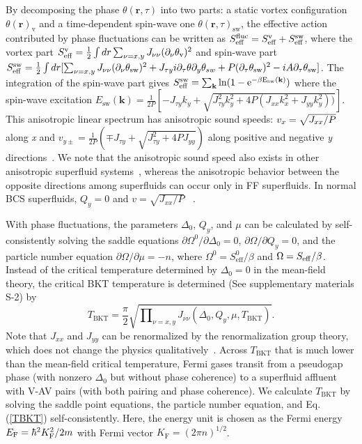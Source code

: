 \documentclass[prl,aps,twocolumn,showpacs, floatfix]{revtex4}
\begin{document}
By decomposing the phase $\theta (\mathbf{r},\tau )$ into two parts: a
static vortex configuration $\theta (\mathbf{r})_{\mathrm{v}}$ and a
time-dependent spin-wave one $\theta (\mathbf{r},\tau )_{\mathrm{sw}}$, the
effective action contributed by phase fluctuations can be written as $S_{%
\mathrm{eff}}^{\mathrm{fluc}}=S_{\mathrm{eff}}^{\mathrm{v}}+S_{\mathrm{eff}%
}^{\mathrm{sw}}$, where the vortex part $S_{\mathrm{eff}}^{\mathrm{v}}=\frac{%
1}{2}\int d{r}\sum_{\nu =x,y}J_{\nu \nu }(\partial _{\nu }\theta _{\mathrm{v}%
})^{2}$ and spin-wave part $S_{\mathrm{eff}}^{\mathrm{sw}}=\frac{1}{2}\int d{%
r}[\sum_{\nu =x,y}J_{\nu \nu }(\partial _{\nu }\theta _{\mathrm{sw}%
})^{2}+J_{\tau y}i\partial _{\tau }\theta \partial _{y}\theta
_{sw}+P(\partial _{\tau }\theta _{\mathrm{sw}})^{2}-iA\partial _{\tau
}\theta _{\mathrm{sw}}]$. The integration of the spin-wave part gives $S_{%
\mathrm{eff}}^{\mathrm{sw}}=\sum_{\mathbf{k}}\mathrm{{ln}(1-e^{-\beta E_{sw}(%
\mathbf{k})})}$ where the spin-wave excitation $E_{\mathrm{sw}}(\mathbf{k}%
)=\frac{1}{2P}[-J_{\tau y}k_{y}+\sqrt{J_{\tau
y}^{2}k_{y}^{2}+4P(J_{xx}k_{x}^{2}+J_{yy}k_{y}^{2}))}]$. This
anisotropic linear spectrum has anisotropic sound speeds: $v_{x}=\sqrt{%
J_{xx}/P}$ along \textit{x} and $v_{y\pm}=\frac{1}{2P}(\mp J_{\tau y}+\sqrt{J_{\tau y}^{2}+4PJ_{yy}})$
along positive and negative \textit{y} directions~\cite{Yong2014PRL}.
We note that the anisotropic sound speed also exists in other anisotropic
superfluid systems~\cite{Melo2014arXiv}, whereas the anisotropic behavior
between the opposite directions among superfluids can occur only in FF
superfluids. In normal BCS superfluids, $Q_{y}=0$ and $v=\sqrt{J_{xx}/P}$~%
\cite{MeloPRL,MingGongPRL}.

With phase fluctuations, the parameters $\Delta _{0}$, $Q_{y}$, and $\mu $
can be calculated by self-consistently solving the saddle equations $%
\partial \Omega ^{0}/\partial \Delta _{0}=0$, $\partial \Omega /\partial
Q_{y}=0$, and the particle number equation $\partial \Omega /\partial \mu =-n
$, where $\Omega ^{0}=S_{\mathrm{eff}}^{0}/\beta $ and $\Omega =S_{\mathrm{%
eff}}/\beta $. Instead of the critical temperature determined by $\Delta
_{0}=0$ in the mean-field theory, the critical BKT temperature is determined
\cite{Thouless,Torma2014PRB,Melo2014arXiv} (See supplementary materials S-2)
by
\begin{equation}
T_{\mathrm{BKT}}=\frac{\pi }{2}\sqrt{\prod\nolimits_{\nu =x,y}J_{\nu \nu
}(\Delta _{0},Q_{y},\mu ,T_{\mathrm{BKT}})}.  \label{TBKT}
\end{equation}%
Note that $J_{xx}$ and $J_{yy}$ can be renormalized by the renormalization
group theory, which does not change the physics qualitatively~\cite%
{StoofColdField}. Across $T_{\mathrm{BKT}}$ that is much lower than the
mean-field critical temperature, Fermi gases transit from a pseudogap phase
(with nonzero $\Delta _{0}$ but without phase coherence) to a superfluid
affluent with V-AV pairs (with both pairing and phase coherence). We
calculate $T_{\mathrm{BKT}}$ by solving the saddle point equations, the
particle number equation, and Eq.(\ref{TBKT}) self-consistently. Here, the
energy unit is chosen as the Fermi energy $E_{\mathrm{F}}=\hbar ^{2}{K}_{%
\mathrm{F}}^{2}/2m$ with Fermi vector $K_{\mathrm{F}}=(2\pi n)^{1/2}$.
\end{document}
